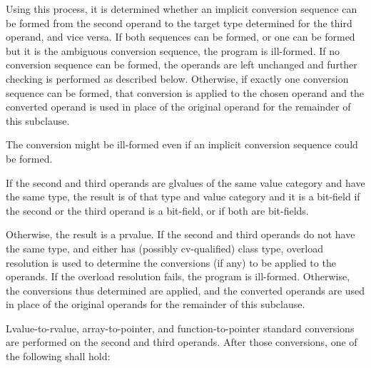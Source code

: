 Using this process, it is determined whether an implicit conversion
sequence can be formed from the second operand
to the target type determined for the third operand, and vice versa.
If both sequences can be formed, or one can be formed but it is the
ambiguous conversion sequence, the program is ill-formed.
If no conversion sequence can be formed, the operands are left unchanged
and further checking is performed as described below.
Otherwise, if exactly one conversion sequence can be formed,
that conversion is applied to the chosen operand
and the converted operand is used in place of the original operand for
the remainder of this subclause.
\begin{note}
The conversion might be ill-formed even if an implicit conversion
sequence could be formed.
\end{note}

\pnum
If the second and third operands are glvalues of the same value category
and have the same type, the
result is of that type and value category and it is a bit-field if the
second or the third operand is a bit-field, or if both are bit-fields.

\pnum
Otherwise, the result is a prvalue. If the second and third operands do
not have the same type, and either has (possibly cv-qualified) class
type, overload resolution is used to determine the conversions (if any)
to be applied to the operands.
If the overload resolution fails, the program is ill-formed. Otherwise,
the conversions thus determined are applied, and the converted operands
are used in place of the original operands for the remainder of this
subclause.

\pnum
Lvalue-to-rvalue, array-to-pointer,
and function-to-pointer standard conversions are
performed on the second and third operands. After those conversions, one
of the following shall hold:

